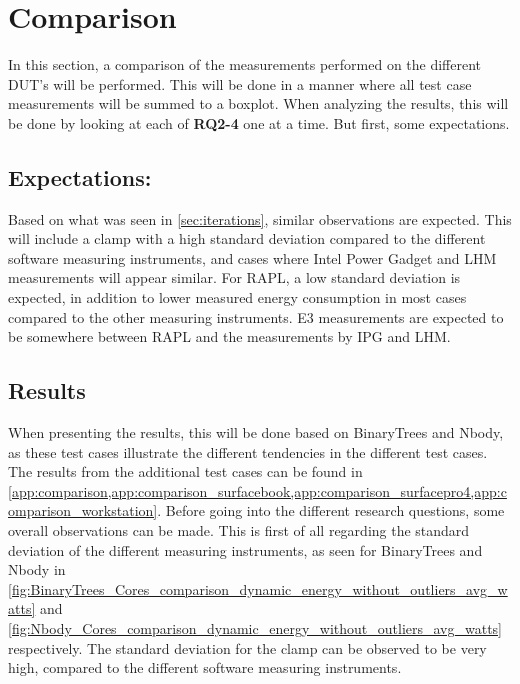 \section{Comparison}\label{sec:comparison}

In this section, a comparison of the measurements performed on the different DUT's will be performed. This will be done in a manner where all test case measurements will be summed to a boxplot. When analyzing the results, this will be done by looking at each of \textbf{RQ2-4} one at a time. But first, some expectations.


\subsection{Expectations:} 

Based on what was seen in \cref{sec:iterations}, similar observations are expected. This will include a clamp with a high standard deviation compared to the different software measuring instruments, and cases where Intel Power Gadget and LHM measurements will appear similar. For RAPL, a low standard deviation is expected, in addition to lower measured energy consumption in most cases compared to the other measuring instruments. E3 measurements are expected to be somewhere between RAPL and the measurements by IPG and LHM.


\subsection{Results}

When presenting the results, this will be done based on BinaryTrees and Nbody, as these test cases illustrate the different tendencies in the different test cases. The results from the additional test cases can be found in \cref*{app:comparison,app:comparison_surfacebook,app:comparison_surfacepro4,app:comparison_workstation}. Before going into the different research questions, some overall observations can be made. This is first of all regarding the standard deviation of the different measuring instruments, as seen for BinaryTrees and Nbody in \cref*{fig:BinaryTrees_Cores_comparison_dynamic_energy_without_outliers_avg_watts} and \cref*{fig:Nbody_Cores_comparison_dynamic_energy_without_outliers_avg_watts} respectively. The standard deviation for the clamp can be observed to be very high, compared to the different software measuring instruments.






